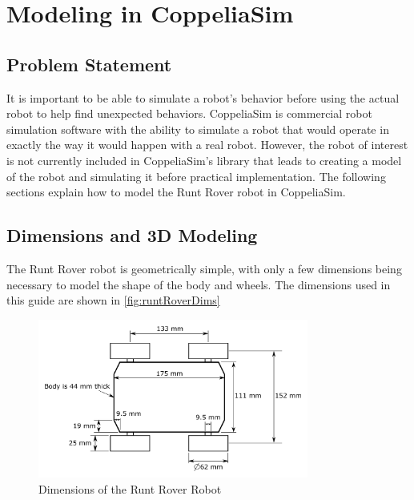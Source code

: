 \chapter{Modeling in CoppeliaSim}
\label{ch:Chapter1}

\section{Problem Statement}
It is important to be able to simulate a robot's behavior before using the
actual robot to help find unexpected behaviors. CoppeliaSim is commercial robot
simulation software with the ability to simulate a robot that would operate in
exactly the way it would happen with a real robot. However, the robot of
interest is not currently included in CoppeliaSim's library that leads to
creating a model of the robot and simulating it before practical implementation.
The following sections explain how to model the Runt Rover robot in CoppeliaSim.

\section{Dimensions and 3D Modeling}
The Runt Rover robot is geometrically simple, with only a few dimensions being necessary to model the shape of the body and wheels. The dimensions used in this guide are shown in \autoref{fig:runtRoverDims}

\begin{figure}
    \centering
    \includegraphics[width=3.5in]{figs/img/runtRoverDimensions}
    \caption{Dimensions of the Runt Rover Robot}
    \label{fig:runtRoverDims}
\end{figure}

